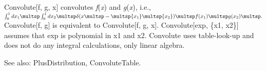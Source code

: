 


Convolute[f, g, x] convolutes {\itshape f}({\itshape x}) and {\itshape g}({\itshape x}), i.e., \(\int _{0}^{1}{{dx}_1}\multsp \int _{0}^{1}{{dx}_2}\multsp
\delta (x\multsp -\multsp {x_1}\multsp {x_2})\multsp f({x_1})\multsp
      g({x_2})\multsp .\) Convolute[f, g] is equivalent to Convolute[f, g, x]. Convolute[exp, \{x1, x2\}] assumes that exp is polynomial in x1 and
x2. Convolute
  uses table-look-up and does not do any integral calculations, only linear algebra.



See also:  PlusDistribution, ConvoluteTable.
















